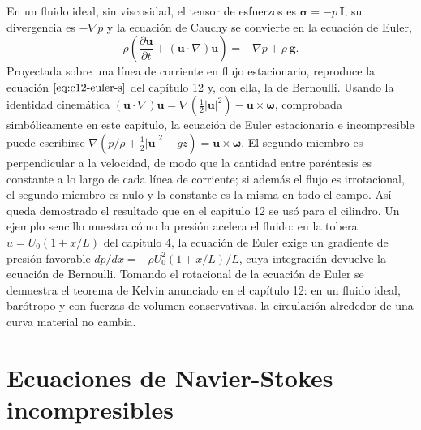 \documentclass[10pt,openany]{book}
\begin{document}
En un fluido ideal, sin viscosidad, el tensor de esfuerzos es \(\boldsymbol{\sigma} = -p\,\mathbf{I}\), su divergencia es \(-\nabla p\) y la ecuación de Cauchy se convierte en la ecuación de Euler,
\begin{equation}
\rho\left(\frac{\partial\mathbf{u}}{\partial t} + (\mathbf{u}\cdot\nabla)\mathbf{u}\right) = -\nabla p + \rho\,\mathbf{g}. \label{eq:c14-euler}
\end{equation}
Proyectada sobre una línea de corriente en flujo estacionario, reproduce la ecuación \(\eqref{eq:c12-euler-s}\) del capítulo 12 y, con ella, la de Bernoulli. Usando la identidad cinemática \((\mathbf{u}\cdot\nabla)\mathbf{u} = \nabla(\tfrac12|\mathbf{u}|^{2}) - \mathbf{u}\times\boldsymbol{\omega}\), comprobada simbólicamente en este capítulo, la ecuación de Euler estacionaria e incompresible puede escribirse \(\nabla(p/\rho + \tfrac12|\mathbf{u}|^{2} + g z) = \mathbf{u}\times\boldsymbol{\omega}\). El segundo miembro es perpendicular a la velocidad, de modo que la cantidad entre paréntesis es constante a lo largo de cada línea de corriente; si además el flujo es irrotacional, el segundo miembro es nulo y la constante es la misma en todo el campo. Así queda demostrado el resultado que en el capítulo 12 se usó para el cilindro. Un ejemplo sencillo muestra cómo la presión acelera el fluido: en la tobera \(u = U_0(1 + x/L)\) del capítulo 4, la ecuación de Euler exige un gradiente de presión favorable \(dp/dx = -\rho U_0^{2}(1 + x/L)/L\), cuya integración devuelve la ecuación de Bernoulli. Tomando el rotacional de la ecuación de Euler se demuestra el teorema de Kelvin anunciado en el capítulo 12: en un fluido ideal, barótropo y con fuerzas de volumen conservativas, la circulación alrededor de una curva material no cambia.

\section{Ecuaciones de Navier-Stokes incompresibles}
\end{document}
